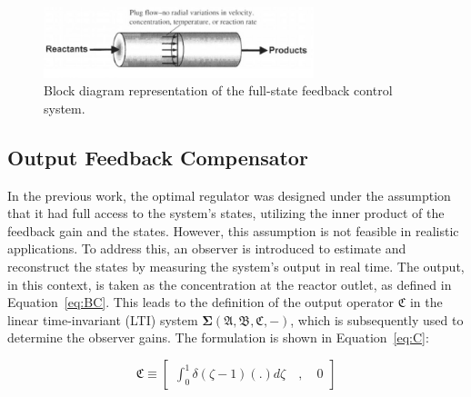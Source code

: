 \begin{figure}
    \centering
    \includegraphics*[width=0.7\textwidth]{Figures/sample.jpeg}
    \caption{Block diagram representation of the full-state feedback control system.}
    \label{fig:block_diagram}
\end{figure}

\subsection{Output Feedback Compensator}

In the previous work, the optimal regulator was designed under the assumption that it had full access to the system's states, utilizing the inner product of the feedback gain and the states. However, this assumption is not feasible in realistic applications. To address this, an observer is introduced to estimate and reconstruct the states by measuring the system's output in real time. The output, in this context, is taken as the concentration at the reactor outlet, as defined in Equation~\ref{eq:BC}. This leads to the definition of the output operator $\mathfrak{C}$ in the linear time-invariant (LTI) system $\mathbf{\Sigma(\mathfrak{A},\mathfrak{B},\mathfrak{C},-)}$, which is subsequently used to determine the observer gains. The formulation is shown in Equation~\ref{eq:C}:

\begin{equation} \label{eq:C}
    \mathfrak{C} \equiv \begin{bmatrix}
        \int_0^1 \delta(\zeta-1) (.) d\zeta \quad , \quad 0
    \end{bmatrix}
\end{equation}

